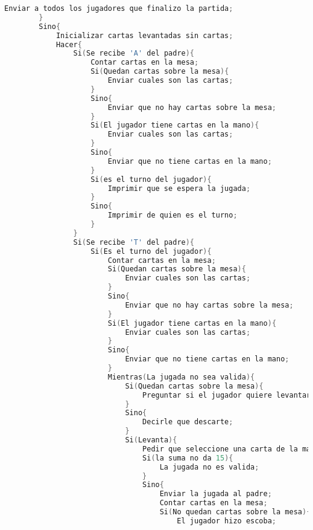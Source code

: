\begin{lstlisting}[language=C]
            Enviar a todos los jugadores que finalizo la partida;
        }
        Sino{
            Inicializar cartas levantadas sin cartas;
            Hacer{
                Si(Se recibe 'A' del padre){
                    Contar cartas en la mesa;
                    Si(Quedan cartas sobre la mesa){
                        Enviar cuales son las cartas;
                    }
                    Sino{
                        Enviar que no hay cartas sobre la mesa;
                    }
                    Si(El jugador tiene cartas en la mano){
                        Enviar cuales son las cartas;
                    }
                    Sino{
                        Enviar que no tiene cartas en la mano;
                    }
                    Si(es el turno del jugador){
                        Imprimir que se espera la jugada;
                    }
                    Sino{
                        Imprimir de quien es el turno;
                    }
                }
                Si(Se recibe 'T' del padre){
                    Si(Es el turno del jugador){
                        Contar cartas en la mesa;
                        Si(Quedan cartas sobre la mesa){
                            Enviar cuales son las cartas;
                        }
                        Sino{
                            Enviar que no hay cartas sobre la mesa;
                        }
                        Si(El jugador tiene cartas en la mano){
                            Enviar cuales son las cartas;
                        }
                        Sino{
                            Enviar que no tiene cartas en la mano;
                        }
                        Mientras(La jugada no sea valida){
                            Si(Quedan cartas sobre la mesa){
                                Preguntar si el jugador quiere levantar o descartar;
                            }
                            Sino{
                                Decirle que descarte;
                            }
                            Si(Levanta){
                                Pedir que seleccione una carta de la mano y las correspondientes de la mesa;
                                Si(la suma no da 15){
                                    La jugada no es valida;
                                }
                                Sino{
                                    Enviar la jugada al padre;
                                    Contar cartas en la mesa;
                                    Si(No quedan cartas sobre la mesa){
                                        El jugador hizo escoba;

\end{lstlisting}
